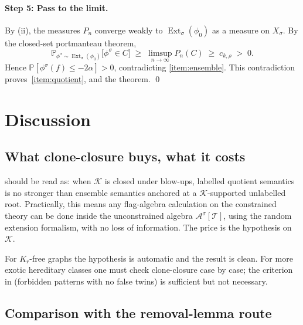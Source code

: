 \documentclass[11pt]{article}
\theoremstyle{definition}
\newcommand{\Prob}{\mathbb{P}}
\newcommand{\A}{\mathcal{A}}
\newcommand{\K}{\mathcal{K}}
\newcommand{\T}{\mathcal{T}}
\newcommand{\Ext}{\operatorname{Ext}}
\begin{document}
\paragraph{Step 5: Pass to the limit.}
By (ii), the measures $P_n$ converge weakly to
$\Ext_\sigma(\phi_0)$ as a measure on $X_\sigma$.  By the closed-set
portmanteau theorem,
\[
  \Prob_{\phi^\sigma\sim\Ext_\sigma(\phi_0)}\!\bigl[\phi^\sigma\in C\bigr]
  \;\ge\;\limsup_{n\to\infty}P_n(C)
  \;\ge\; c_{k,\rho}\;>\;0.
\]
Hence $\Prob[\phi^\sigma(f)\le-2\alpha]>0$, contradicting
\ref{item:ensemble}.  This contradiction
proves~\ref{item:quotient}, and the theorem.
\qed

\section{Discussion}\label{sec:discussion}

\subsection{What clone-closure buys, what it costs}

 should be read as: when $\K$ is closed under blow-ups,
labelled quotient semantics is no stronger than ensemble semantics
anchored at a $\K$-supported unlabelled root.  Practically, this means
any flag-algebra calculation on the constrained theory can be done
inside the unconstrained algebra $\A^\sigma[\T]$, using the random
extension formalism, with no loss of information.  The price is the
hypothesis on $\K$.

For $K_r$-free graphs the hypothesis is automatic and the result is
clean.  For more exotic hereditary classes one must check
clone-closure case by case; the criterion in 
(forbidden patterns with no false twins) is sufficient but not
necessary.

\subsection{Comparison with the removal-lemma route}
\end{document}
